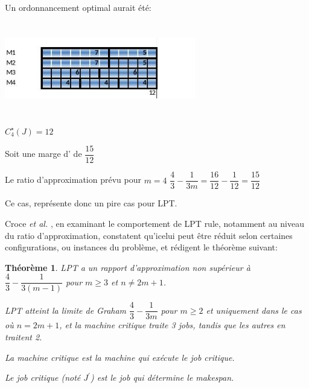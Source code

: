 \documentclass[a4paper,12pt]{report}
\theoremstyle{plain}				%
\newtheorem{theoreme1}{Théorème}	%
\theoremstyle{definition}				%
\begin{document}
\bigskip

\begin{minipage}{\linewidth}

\begin{flushleft}
Un ordonnancement optimal aurait été:
\end{flushleft}

{\centering
\includegraphics[width=8.334cm,height=4.034cm]{Biblio_PCmax_Rendu_exLPT_Rev2.jpg}
\par}


\begin{flushleft}
$C_4^{\star}(J)=12$
\end{flushleft}

\end{minipage}

Soit une marge d' de $\dfrac{15}{12}$

Le ratio d'approximation prévu pour $m=4$
$\dfrac{4}{3} - \dfrac{1}{3m}=\dfrac{16}{12} - \dfrac{1}{12}=\dfrac{15}{12}$

Ce cas, représente donc un pire cas pour LPT.

Croce \textit{et al.}
\cite{della2018longest}, en examinant le comportement de LPT rule,
notamment au niveau du ratio d'approximation, constatent qu'icelui
peut être réduit selon certaines configurations, ou instances du
problème, et rédigent le théorème suivant:

\bigskip

\begin{theoreme1}

  LPT a un rapport d'approximation non supérieur à
  $\dfrac{4}{3} - \dfrac{1}{3(m-1)}$ pour $m \geq 3$ et $n \neq 2m+1$.

  LPT atteint la limite de Graham $\dfrac{4}{3} - \dfrac{1}{3m}$ pour
  $m \geq 2$ et uniquement dans le cas où $n=2m+1$, et la machine
  critique traite 3 jobs, tandis que les autres en traitent 2.

  La machine critique est la machine qui exécute le job critique.

  Le job critique (noté $J^\prime$) est le job qui détermine le
  makespan.
\end{theoreme1}
\end{document}
